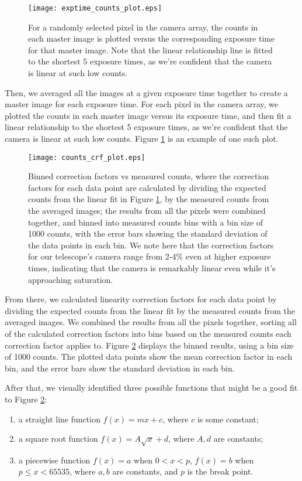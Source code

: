 \documentclass{article}
\begin{document}
\begin{figure}[!htb]
    \centering
    \texttt{[image: exptime\_counts\_plot.eps]}
    \caption{For a randomly selected pixel in the camera array, the counts in each master image is plotted versus the corresponding exposure time for that master image. Note that the linear relationship line is fitted to the shortest 5 exposure times, as we're confident that the camera is linear at such low counts.}
    \label{fig1}
\end{figure}

Then, we averaged all the images at a given exposure time together to create a master image for each exposure time. For each pixel in the camera array, we plotted the counts in each master image versus its exposure time, and then fit a linear relationship to the shortest 5 exposure times, as we're confident that the camera is linear at such low counts. Figure \ref{fig1} is an example of one such plot.

\begin{figure}[!htb]
    \centering
    \texttt{[image: counts\_crf\_plot.eps]}
    \caption{Binned correction factors vs measured counts, where the correction factors for each data point are calculated by dividing the expected counts from the linear fit in Figure \ref{fig1}, by the measured counts from the averaged images; the results from all the pixels were combined together, and binned into measured counts bins with a bin size of 1000 counts, with the error bars showing the standard deviation of the data points in each bin. We note here that the correction factors for our telescope's camera range from 2-4\% even at higher exposure times, indicating that the camera is remarkably linear even while it's approaching saturation.}
    \label{fig2}
\end{figure}

From there, we calculated linearity correction factors for each data point by dividing the expected counts from the linear fit by the measured counts from the averaged images. We combined the results from all the pixels together, sorting all of the calculated correction factors into bins based on the measured counts each correction factor applies to. Figure \ref{fig2} displays the binned results, using a bin size of 1000 counts. The plotted data points show the mean correction factor in each bin, and the error bars show the standard deviation in each bin.

After that, we visually identified three possible functions that might be a good fit to Figure \ref{fig2}:
\begin{enumerate}
    \item a straight line function $f(x)=mx+c$, where $c$ is some constant;
    \item a square root function $f(x)=A\sqrt{x}+d$, where $A,d$ are constants;
    \item a piecewise function $f(x)=a$ when $0<x<p$, $f(x)=b$ when $p\leq x<65535$, where $a,b$ are constants, and $p$ is the break point.
\end{enumerate}
\end{document}

